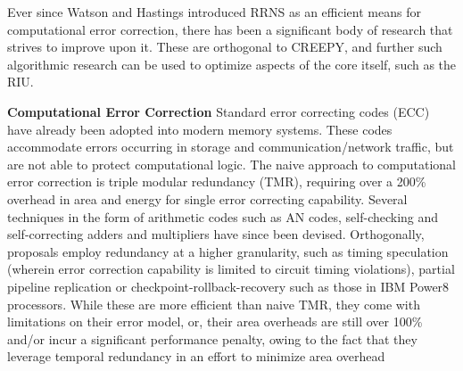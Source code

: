 \documentclass{sig-alternate}
\begin{document}
Ever since Watson and Hastings \cite{Hastings,WatsonThesis,WatsonHastings} introduced RRNS as an efficient means for computational error correction, there has been a significant body of research \cite{tay2016non,bajard2016multi,xiao2016new,xiao2015error,chang2015residue,tay2014new,yin2013new,lo2013parallel,sengupta2013performance,haron2011redundant,tang2010new,goh2008multiple,sweidan2001theory,goldreich1999chinese,katti1996new,krishna1994computational,di1993systolic,krishna1992coding,sun1992coding,sun1992superfast,orton1992new,su1990algorithm,ramachandran1983single,etzel1980redundant,barsi1974error,yau1973error,rao1970biresidue,szabo1967residue} that strives to improve upon it. These are orthogonal to CREEPY, and further such algorithmic research can be used to optimize aspects of the core itself, such as the RIU.

\textbf{Computational Error Correction}
Standard error correcting codes (ECC)\cite{macwilliams1977theory} have already been adopted into modern memory systems. These codes accommodate errors occurring in storage and communication/network traffic, but are not able to protect computational logic. The naive approach to computational error correction is triple modular redundancy (TMR)\cite{von1956probabilistic}, requiring over a 200\% overhead in area and energy for single error correcting capability. Several techniques in the form of arithmetic codes such as AN codes\cite{brown1960error,fetzer2009encoding,forin1989vital,liu1972error,schiffel2010anb,wappler2007hardware}, self-checking\cite{johnson1988efficient,keren2008arbitrary,marienfeld2005new,nicolaidis2003carry,nicolaidis1998design,nicolaidis1994efficient,vasudevan2005technique} and self-correcting\cite{sun2010cost,hsu1992time,peng2005fault,dolev2013preserving,ghosh2008novel,krekhov2008method,mathew2010multiple,rao2008towards,rao2006fault,valinataj2007fault} adders and multipliers have since been devised. Orthogonally, proposals employ redundancy at a higher granularity, such as timing speculation (wherein error correction capability is limited to circuit timing violations)\cite{razor_2003,decor_2008}, partial pipeline replication\cite{DIVA} or checkpoint-rollback-recovery such as those in IBM Power8 processors\cite{ibmpower8}. While these are more efficient than naive TMR, they come with limitations on their error model, or, their area overheads are still over 100\% and/or incur a significant performance penalty, owing to the fact that they leverage temporal redundancy in an effort to minimize area overhead\cite{srikanth2016brief}
\end{document}
